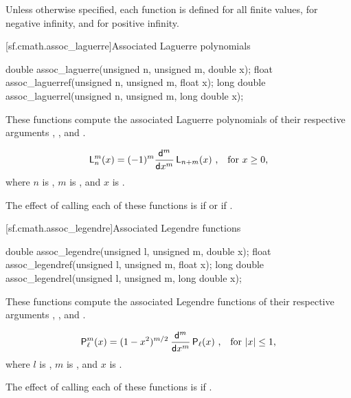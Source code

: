 \pnum
Unless otherwise specified,
each function is defined
for all finite values,
for negative infinity,
and for positive infinity.

[sf.cmath.assoc_laguerre]{Associated Laguerre polynomials}%
%
%
%
%
%
\begin{itemdecl}
double       assoc_laguerre(unsigned n, unsigned m, double x);
float        assoc_laguerref(unsigned n, unsigned m, float x);
long double  assoc_laguerrel(unsigned n, unsigned m, long double x);
\end{itemdecl}

\begin{itemdescr}
\pnum
\effects
These functions compute
the associated Laguerre polynomials
of their respective arguments
, , and .

\pnum
\returns
\[ \mathsf{L}_n^m(x) =
   (-1)^m \frac{\mathsf{d} ^ m}{\mathsf{d}x ^ m} \, \mathsf{L}_{n+m}(x)
   \text{ ,\quad for $x \ge 0$,} \]
where
$n$ is ,
$m$ is , and
$x$ is .

\pnum
\remarks
The effect of calling each of these functions
is 
if  or if .
\end{itemdescr}

[sf.cmath.assoc_legendre]{Associated Legendre functions}%
%
%
%
%
%
\begin{itemdecl}
double       assoc_legendre(unsigned l, unsigned m, double x);
float        assoc_legendref(unsigned l, unsigned m, float x);
long double  assoc_legendrel(unsigned l, unsigned m, long double x);
\end{itemdecl}

\begin{itemdescr}

\pnum\effects
These functions compute
the associated Legendre functions
of their respective arguments
, , and .

\pnum
\returns
\[ \mathsf{P}_\ell^m(x) = (1 - x^2) ^ {m/2} \:
   \frac{\mathsf{d} ^ m}{\mathsf{d}x ^ m} \, \mathsf{P}_\ell(x)
   \text{ ,\quad for $|x| \le 1$,} \]
where
$l$ is ,
$m$ is , and
$x$ is .

\pnum
\remarks
The effect of calling each of these functions
is 
if .
\end{itemdescr}

